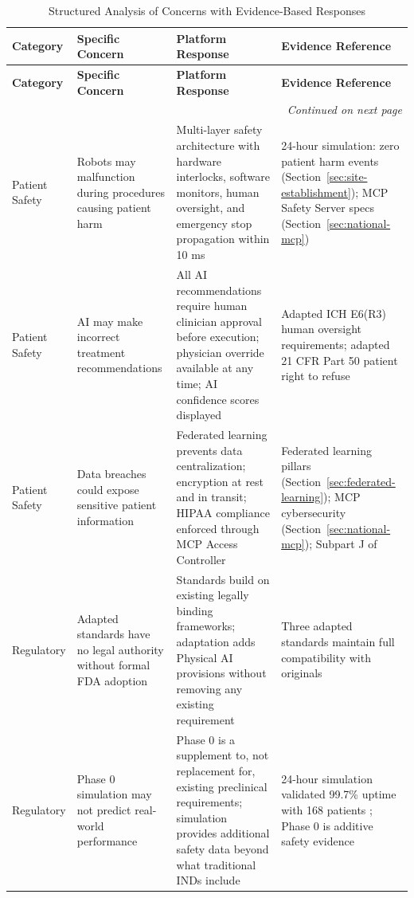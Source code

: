 \begin{longtable}{p{2.2cm} p{3.5cm} p{3.0cm} p{3.0cm}}
\caption{Structured Analysis of Concerns with Evidence-Based Responses}
\label{tab:structured-concerns} \\
\toprule
\textbf{Category} & \textbf{Specific Concern} & \textbf{Platform Response} & \textbf{Evidence Reference} \\
\midrule
\endfirsthead
\toprule
\textbf{Category} & \textbf{Specific Concern} & \textbf{Platform Response} & \textbf{Evidence Reference} \\
\midrule
\endhead
\midrule
\multicolumn{4}{r}{\textit{Continued on next page}} \\
\bottomrule
\endfoot
\bottomrule
\endlastfoot
Patient Safety & Robots may malfunction during procedures causing patient harm & Multi-layer safety architecture with hardware interlocks, software monitors, human oversight, and emergency stop propagation within 10 ms & 24-hour simulation: zero patient harm events (Section~\ref{sec:site-establishment}); MCP Safety Server specs (Section~\ref{sec:national-mcp}) \\
\midrule
Patient Safety & AI may make incorrect treatment recommendations & All AI recommendations require human clinician approval before execution; physician override available at any time; AI confidence scores displayed & Adapted ICH E6(R3) \cite{ich-adapt} human oversight requirements; adapted 21 CFR Part 50 \cite{cfr50-adapt} patient right to refuse \\
\midrule
Patient Safety & Data breaches could expose sensitive patient information & Federated learning prevents data centralization; encryption at rest and in transit; HIPAA compliance enforced through MCP Access Controller & Federated learning pillars (Section~\ref{sec:federated-learning}); MCP cybersecurity (Section~\ref{sec:national-mcp}); Subpart J of \cite{cfr312-adapt} \\
\midrule
Regulatory & Adapted standards have no legal authority without formal FDA adoption & Standards build on existing legally binding frameworks; adaptation adds Physical AI provisions without removing any existing requirement & Three adapted standards \cite{ich-adapt, cfr50-adapt, cfr312-adapt} maintain full compatibility with originals \\
\midrule
Regulatory & Phase 0 simulation may not predict real-world performance & Phase 0 is a supplement to, not replacement for, existing preclinical requirements; simulation provides additional safety data beyond what traditional INDs include & 24-hour simulation validated 99.7\% uptime with 168 patients \cite{site-docs}; Phase 0 is additive safety evidence \\

\end{longtable}
